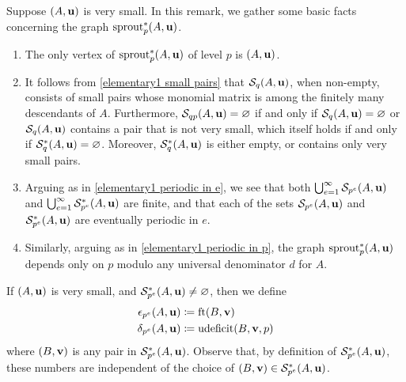 \documentclass[11pt]{amsart}
\newcommand{\udeficit}{\operatorname{udeficit}}
\newcommand{\denom}{d}
\renewcommand{\S}{\mathcal{S}}
\begin{document}
\begin{remark}
   \label{elementary2: R}
   Suppose $(A,\mathbf{u})$ is very small.
   In this remark, we gather some basic facts  concerning the graph $\operatorname{sprout}^{\ast}_p(A,\mathbf{u})$.
   \begin{enumerate}
      \item  \label{elementary2 lowest level}
      The only vertex of $\operatorname{sprout}_p^{\ast}(A,\mathbf{u})$ of level $p$ is $(A,\mathbf{u})$.
      \item \label{elementary2 small pairs}
      It follows from \eqref{elementary1 small pairs} that $\S_{q}(A,\vv{u})$, when non-empty, consists of small pairs whose monomial matrix is among the finitely many descendants of $A$.
      Furthermore, $\S_{qp}(A,\vv{u}) = \emptyset$ if and only if $\S_q(A,\vv{u}) = \emptyset$ or $\S_q(A,\vv{u})$ contains a pair that is not very small, which itself holds if and only if $\S_{q}^{\ast}(A,\vv{u})= \emptyset$.
      Moreover, $\S_q^{\ast}(A,\vv{u})$ is either empty, or contains only very small pairs.
      \item \label{elementary2 periodic in e}
      Arguing as in \eqref{elementary1 periodic in e}, we see that both $\bigcup_{e=1}^{\infty} \S_{p^e}(A,\vv{u})$ and  $\bigcup_{e=1}^{\infty} \S^{\ast}_{p^e}(A,\vv{u})$ are finite, and that each of the sets $\S_{p^e}(A,\vv{u})$ and $\S^{\ast}_{p^e}(A,\vv{u})$ are eventually periodic in $e$.
      \item \label{elementary2 periodic in p}
      Similarly, arguing as in \eqref{elementary1 periodic in p}, the graph $\operatorname{sprout}_p^{\ast}(A,\mathbf{u})$ depends only on $p$ modulo any universal denominator $\denom$ for $A$.
   \end{enumerate}
\end{remark}


\begin{definition}
   \label{epsilon delta: D}
   If $(A,\mathbf{u})$ is very small, and $\S^{\ast}_{p^e}(A,\vv{u}) \neq \emptyset$, then we define
   \begin{align*}
     \epsilon_{p^e}(A,\vv{u}) & \coloneqq \ft{B}{\vv{v}} \\
     \delta_{p^e}(A,\vv{u}) & \coloneqq \udeficit(B,\vv{v},p)
   \end{align*}
   where $(B,\mathbf{v})$ is any pair in $\S^{\ast}_{p^e}(A,\vv{u})$.
   Observe that, by definition of $\S^{\ast}_{p^e}(A,\vv{u})$, these numbers are independent of the choice of $(B,\vv{v}) \in \S^{\ast}_{p^e}(A,\vv{u})$.
\end{definition}
\end{document}
